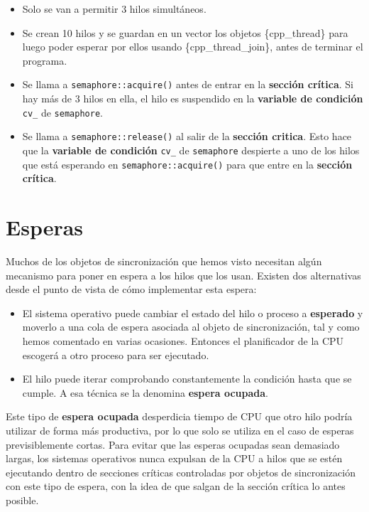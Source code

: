 \begin{itemize}
\item
  Solo se van a permitir 3 hilos simultáneos.
\item
  Se crean 10 hilos y se guardan en un vector los objetos
  \{cpp\_thread\} para luego poder esperar por ellos usando
  \{cpp\_thread\_join\}, antes de terminar el programa.
\item
  Se llama a \texttt{semaphore::acquire()} antes de entrar en la
  \textbf{sección crítica}. Si hay más de 3 hilos en ella, el hilo es
  suspendido en la \textbf{variable de condición} \texttt{cv\_} de
  \texttt{semaphore}.
\item
  Se llama a \texttt{semaphore::release()} al salir de la
  \textbf{sección critica}. Esto hace que la \textbf{variable de
  condición} \texttt{cv\_} de \texttt{semaphore} despierte a uno de los
  hilos que está esperando en \texttt{semaphore::acquire()} para que
  entre en la \textbf{sección crítica}.
\end{itemize}

\section{Esperas}\label{_esperas}

Muchos de los objetos de sincronización que hemos visto necesitan algún
mecanismo para poner en espera a los hilos que los usan. Existen dos
alternativas desde el punto de vista de cómo implementar esta espera:

\begin{itemize}
\item
  El sistema operativo puede cambiar el estado del hilo o proceso a
  \textbf{esperado} y moverlo a una cola de espera asociada al objeto de
  sincronización, tal y como hemos comentado en varias ocasiones.
  Entonces el planificador de la CPU escogerá a otro proceso para ser
  ejecutado.
\item
  El hilo puede iterar comprobando constantemente la condición hasta que
  se cumple. A esa técnica se la denomina \textbf{espera ocupada}{}.
\end{itemize}

Este tipo de \textbf{espera ocupada} desperdicia tiempo de CPU que otro
hilo podría utilizar de forma más productiva, por lo que solo se utiliza
en el caso de esperas previsiblemente cortas. Para evitar que las
esperas ocupadas sean demasiado largas, los sistemas operativos nunca
expulsan de la CPU a hilos que se estén ejecutando dentro de secciones
críticas controladas por objetos de sincronización con este tipo de
espera, con la idea de que salgan de la sección crítica lo antes
posible.

